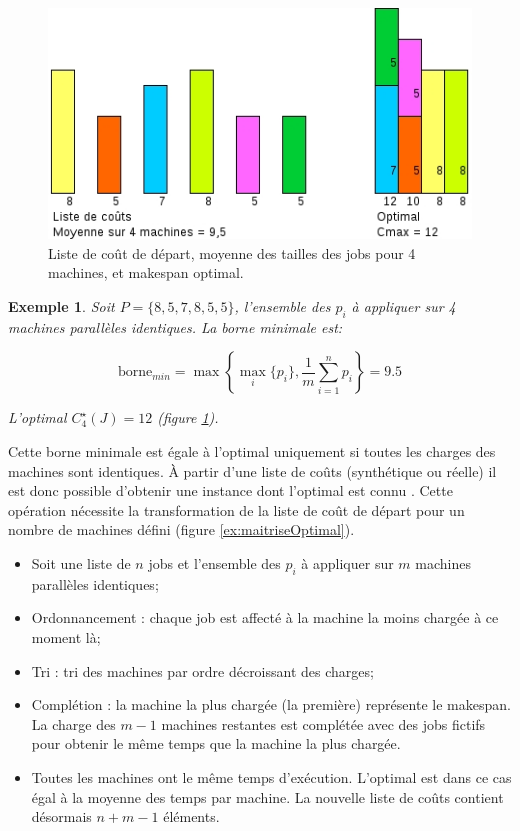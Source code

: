 \documentclass[a4paper,12pt]{report}
\theoremstyle{plain}				%
\newtheorem{example}{Exemple}
\theoremstyle{definition}				%
\newcommand{\lp}[1]{\todo[author=LP,color=yellow,inline]{#1}}
\newcommand{\jb}[1]{\todo[author=JB,color=orange,inline]{#1}}
\begin{document}
\bigskip

\begin{figure}
{\centering
\includegraphics[width=\columnwidth]{MoyenneVsOptimal.jpg}
\caption{Liste de coût de départ, moyenne des tailles des jobs pour 4 machines, et makespan optimal.}
\label{ex:borneMinVSOptimalListeDepart}
\par}
\end{figure}

\begin{example}
Soit $P=\{8, 5, 7, 8, 5, 5\}$, l'ensemble des $p_i$ à appliquer sur 4 machines parallèles identiques.
La borne minimale est:


$$\text{borne}_{min} = \max \left\{ \max_i\{p_i\}, \frac{1}{m} \sum_{i=1}^{n} p_i \right\} = 9.5$$


L'optimal $C_4^\star(J) = 12$ (figure \ref{ex:borneMinVSOptimalListeDepart}).
\end{example}

Cette borne minimale est égale à l'optimal uniquement si toutes les char\-ges des machines sont identiques.
À partir d'une liste de coûts (synthétique ou réelle) il est donc possible d'obtenir une instance dont l'optimal est connu \cite{benoit2021update}. Cette opération nécessite la transformation de la liste de coût de départ pour un nombre de machines défini (figure \ref{ex:maitriseOptimal}).
\begin{itemize}
	\item Soit une liste de $n$ jobs et l'ensemble des $p_i$ à appliquer sur $m$ machines parallèles identiques;
	\item Ordonnancement : chaque job est affecté à la machine la moins chargée à ce moment là;
	\item Tri : tri des machines par ordre décroissant des charges;
	\item Complétion : la machine la plus chargée (la première) représente le makespan. 
	La charge des $m-1$ machines restantes est complétée avec des jobs fictifs pour obtenir 
	le même temps que la machine la plus chargée.
	\item Toutes les machines ont le même temps d'exécution. L'optimal est dans ce cas égal à la 
	      moyenne des temps par machine. 
	      La nouvelle liste de coûts contient désormais $n + m-1$ éléments.
\end{itemize}
\end{document}
